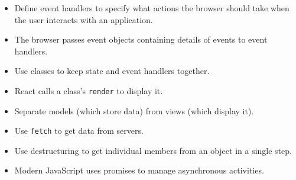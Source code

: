 \begin{itemize}
\item
  Define event handlers to specify what actions the browser should take when the user interacts with an application.
\item
  The browser passes event objects containing details of events to event handlers.
\item
  Use classes to keep state and event handlers together.
\item
  React calls a class's \texttt{render} to display it.
\item
  Separate models (which store data) from views (which display it).
\item
  Use \texttt{fetch} to get data from servers.
\item
  Use destructuring to get individual members from an object in a single step.
\item
  Modern JavaScript uses promises to manage asynchronous activities.
\end{itemize}
